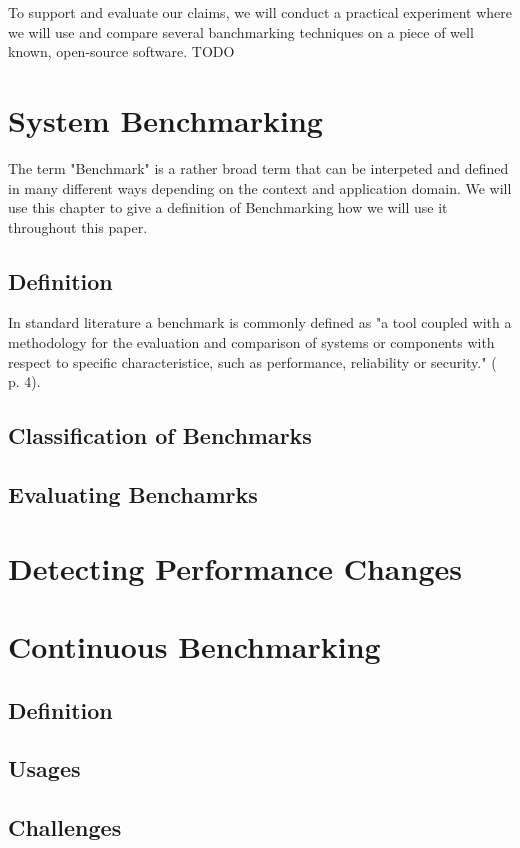 \documentclass[	runningheads,
				a4paper]{llncs}
\begin{document}
To support and evaluate our claims, we will conduct a practical experiment where we will use and compare several banchmarking techniques on a piece of well known, open-source software.
TODO

\section{System Benchmarking}
The term "Benchmark" is a rather broad term that can be interpeted and defined in many different ways depending on the context and application domain. We will use this chapter to give a definition of Benchmarking how we will use it throughout this paper.

\subsection{Definition}
In standard literature a benchmark is commonly defined as "a tool coupled with a methodology for the evaluation and comparison of systems or components with respect to specific characteristice, such as performance, reliability or security." (\cite{sysbench} p. 4).


\subsection{Classification of Benchmarks}

\subsection{Evaluating Benchamrks}

\section{Detecting Performance Changes}

\section{Continuous Benchmarking}
\subsection{Definition}
\subsection{Usages}
\subsection{Challenges}
\end{document}
